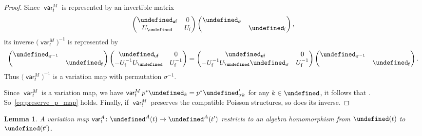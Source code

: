 \documentclass[10pt,a4paper]{amsart}
\newcommand{\opname}[1]{\operatorname{\mathsf{#1}}}
\newcommand{\var}{\opname{var}}
\newcommand{\fv}{\opname{f}}
\newcommand{\ufv}{\opname{uf}}
\let\Iufv\undefined
\let\upClAlg\undefined
\let\LP\undefined
\let\Id\undefined
\let\trans\undefined
\let\ee\undefined
\let\low\undefined
\newcommand{\Iufv}{I_{\ufv}}
\newcommand{\upClAlg}{\mathcal{U}^A}
\newcommand{\LP}{{\mathcal{LP}}}
\newcommand{\Id}{{\opname{Id}}}
\newcommand{\trans}{\opname{P}}
\newcommand{\ee}{\mathbf{e}}
\newcommand{\low}{\opname{\fv,\ufv}}
\numberwithin{equation}{section}
\newtheorem{Lemma}[Theorem]{Lemma}
\begin{document}
\begin{proof}

Since $\var_{t}^{M}$ is represented by an invertible matrix
\[
\begin{pmatrix}
\Id_{\ufv} & 0\\
U_{\low} & U_{\fv}
\end{pmatrix}\begin{pmatrix}
\trans_{\sigma}\\
 & \Id_{\fv}
\end{pmatrix},\]
its inverse $\bigl(\var_{t}^{M}\bigr)^{-1}$ is represented by
\[\begin{pmatrix}
\trans_{\sigma^{-1}}\\
 & \Id_{\fv}
\end{pmatrix}\begin{pmatrix}
\Id_{\ufv} & 0\\
-U_{\fv}^{-1}U_{\low} & U_{\fv}^{-1}
\end{pmatrix}=
\begin{pmatrix}
\Id_{\ufv} & 0\\
-U_{\fv}^{-1}U_{\low}\trans_{\sigma} & U_{\fv}^{-1}
\end{pmatrix}\begin{pmatrix}
\trans_{\sigma^{-1}}\\
 & \Id_{\fv}
\end{pmatrix}.
\]
Thus $\bigl(\var_{t}^{M}\bigr)^{-1}$ is a variation map with permutation ${\sigma}^{-1}$.

Since $\var_{t}^{M}$ is a variation map, we have $\var_{t}^{M}p^{*}\ee_{k}=p^{*}\ee_{\sigma k}'$
for any $k\in\Iufv$, it follows that \smash{$\bigl(\var_{t}^{M}\bigr)^{-1}p^{*}\ee_{k}'=p^{*}\ee_{{\sigma}^{-1}k}$}.
So~\eqref{eq:preserve_p_map} holds. Finally, if $\var_{t}^{M}$ preserves
the compatible Poisson structures, so does its inverse.
\end{proof}


\begin{Lemma}\label{lem:A_variation_restrict_cluster_alg}
 A variation map $\var_{t}^{A}\colon\LP^A(t)\rightarrow\LP^A(t')$ restricts to an algebra homomorphism from $\upClAlg(t)$
 to $\upClAlg(t')$.
 \end{Lemma}
\end{document}
